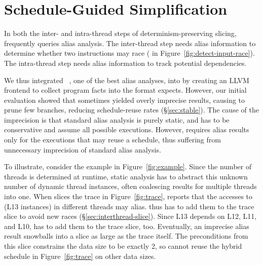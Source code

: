 \section{Schedule-Guided Simplification} \label{sec:guide}

In both the inter- and intra-thread steps of determinism-preserving
slicing, \peregrine frequently queries alias analysis.  The inter-thread step
needs alias information to determine whether two instructions may race
( in Figure~\ref{fig:detect-input-race}).  The intra-thread step
needs alias information to track potential dependencies.

We thus integrated \bddbddb~\cite{bddbddb,bddalias:pldi04}, one of the best alias analyses,
into \peregrine by creating an LLVM frontend to collect program facts into
the format \bddbddb expects.  However, our initial evaluation showed that
\bddbddb sometimes yielded overly imprecise results, causing \peregrine to prune
few branches, reducing schedule-reuse rates (\S\ref{sec:stable}).  The
cause of the imprecision is that
standard alias analysis is purely static, and has to be conservative and
assume all possible executions.  However, \peregrine requires alias results
only for the executions that may reuse a schedule, thus suffering
from unnecessary imprecision of standard alias analysis.







To illustrate, consider the example in Figure~\ref{fig:example}.  Since the
number of threads is determined at runtime, static analysis has to abstract
this unknown number of dynamic thread instances, often coalescing
results for multiple threads into one.  When \peregrine slices the trace in
Figure~\ref{fig:trace}, \bddbddb reports that the accesses to  
(L13 instances) in different threads may alias.
\peregrine thus has to add them to the trace slice to avoid new races
(\S\ref{sec:interthread-slice}).  Since L13 depends 
on L12, L11, and L10, \peregrine has to add them to the trace slice, too.
Eventually, an imprecise alias result snowballs into a slice
as large as the trace itself.  The preconditions from this slice
constrains the data size to be exactly 2, so \peregrine cannot reuse
the hybrid schedule in Figure~\ref{fig:trace} on other data sizes.

